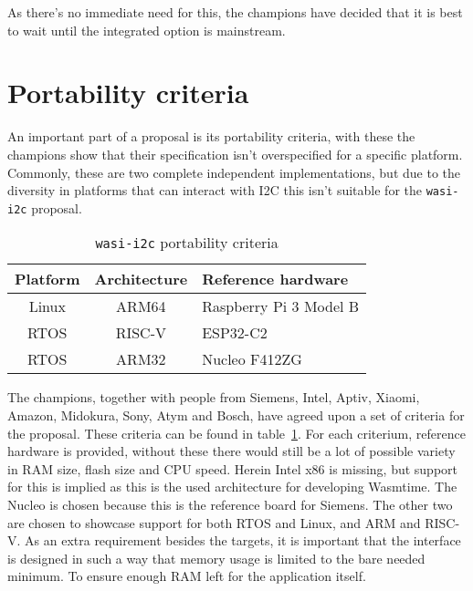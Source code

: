 As there's no immediate need for this, the champions have decided that it is best to wait until the integrated option is mainstream.

\section{Portability criteria}

An important part of a proposal is its portability criteria, with these the champions show that their specification isn't overspecified for a specific platform. Commonly, these are two complete independent implementations, but due to the diversity in platforms that can interact with I2C this isn't suitable for the \texttt{wasi-i2c} proposal. 

\begin{table}[h]
	\centering
	\captionsetup{justification=centering}
	\begin{tabular}{c c l}
		\toprule
		Platform & Architecture & Reference hardware \\ \midrule
        Linux    & ARM64 & Raspberry Pi 3 Model B \\
        RTOS    & RISC-V & ESP32-C2 \\
        RTOS      & ARM32 & Nucleo F412ZG \\
		\bottomrule
	\end{tabular}
    \caption{\texttt{wasi-i2c} portability criteria}
	\label{tab:criteria}
\end{table}

The champions, together with people from Siemens, Intel, Aptiv, Xiaomi, Amazon, Midokura, Sony, Atym and Bosch, have agreed upon a set of criteria for the proposal. These criteria can be found in table~\ref{tab:criteria}. For each criterium, reference hardware is provided, without these there would still be a lot of possible variety in RAM size, flash size and CPU speed. Herein Intel x86 is missing, but support for this is implied as this is the used architecture for developing Wasmtime. The Nucleo is chosen because this is the reference board for Siemens. The other two are chosen to showcase support for both RTOS and Linux, and ARM and RISC-V.
As an extra requirement besides the targets, it is important that the interface is designed in such a way that memory usage is limited to the bare needed minimum. To ensure enough RAM left for the application itself.

